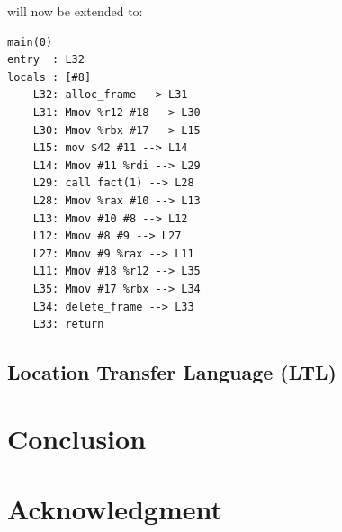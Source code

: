 \documentclass[conference]{IEEEtran}
\begin{document}
will now be extended to:

\begin{lstlisting}
main(0)
entry  : L32
locals : [#8]
	L32: alloc_frame --> L31 
	L31: Mmov %r12 #18 --> L30 
	L30: Mmov %rbx #17 --> L15
	L15: mov $42 #11 --> L14
	L14: Mmov #11 %rdi --> L29
	L29: call fact(1) --> L28 
	L28: Mmov %rax #10 --> L13 
	L13: Mmov #10 #8 --> L12 
	L12: Mmov #8 #9 --> L27 
	L27: Mmov #9 %rax --> L11 
	L11: Mmov #18 %r12 --> L35 
	L35: Mmov #17 %rbx --> L34
	L34: delete_frame --> L33 
	L33: return
\end{lstlisting}


\subsection{Location Transfer Language (LTL)}
\section{Conclusion}

\section*{Acknowledgment}

\newpage
{}


\end{document}
